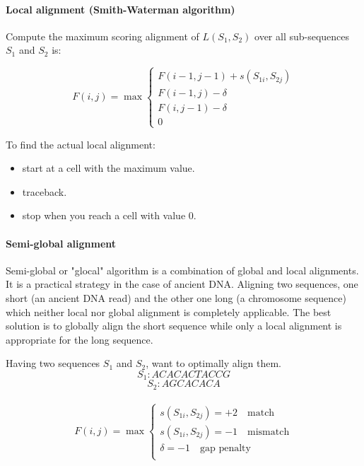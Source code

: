 \documentclass[11pt,a4paper]{report}
\begin{document}


\paragraph{ Local alignment (Smith-Waterman algorithm) }

Compute the maximum scoring alignment of $L(S_{1}, S_{2})$ over all 
sub-sequences $S_{1}$ and $S_{2}$ is:


\[ F(i,j)= \max
\begin{cases}
   F(i-1,j-1) + s(S_{1i} , S_{2j})\\
   F(i-1 , j) - \delta\\
   F(i,j-1) - \delta\\
   0 \quad  
\end{cases}
\]

To find the actual local alignment:
\begin{itemize}
 \item start at a cell with the maximum value.
 \item traceback.
 \item stop when you reach a cell with value 0.
\end{itemize} 







\paragraph{Semi-global alignment}

Semi-global or "glocal" algorithm is a combination 
of global and local alignments. 
It is a practical strategy in the case of ancient DNA.
Aligning two sequences, one short (an ancient DNA read) and the 
other one long (a chromosome sequence) which neither local 
nor global alignment is completely applicable. The best solution
is to globally align the short sequence while only a local alignment
is appropriate for the long sequence.


Having two sequences  $S_{1}$ and $S_{2}$, want to optimally align them.
$$S_{1}:ACACACTACCG$$
$$S_{2}:AGCACACA$$\\

\[ F(i,j)= \max
\begin{cases}
   s(S_{1i},S_{2j})= +2 \quad \mbox{match} \\
   s(S_{1i},S_{2j})= -1 \quad \mbox{mismatch} \\
  \delta = -1  \quad \mbox{gap penalty} \\ 
\end{cases}
\] \\
\end{document}
